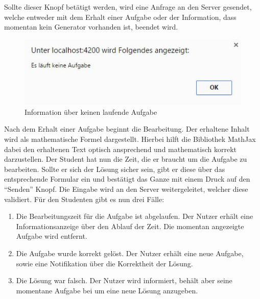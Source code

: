 Sollte dieser Knopf betätigt werden, wird eine Anfrage an den Server gesendet, welche entweder mit dem Erhalt einer Aufgabe oder der Information, dass momentan kein Generator vorhanden ist, beendet wird. \\

\begin{figure}[htp]     %
\centering
\includegraphics[width=1\textwidth]{bilder/NoTaskRunning} 
\caption[Information über keine laufende Aufgabe]{Information über keinen laufende Aufgabe}
\end{figure} 

Nach dem Erhalt einer Aufgabe beginnt die Bearbeitung. Der erhaltene Inhalt wird als mathematische Formel dargestellt. Hierbei hilft die Bibliothek MathJax dabei den erhaltenen Text optisch ansprechend und mathematisch korrekt darzustellen. Der Student hat nun die Zeit, die er braucht um die Aufgabe zu bearbeiten. Sollte er sich der Lösung sicher sein, gibt er diese über das entsprechende Formular ein und bestätigt das Ganze mit einem Druck auf den ``Senden'' Knopf. Die Eingabe wird an den Server weitergeleitet, welcher diese validiert. Für den Studenten gibt es nun drei Fälle: \\
\begin{enumerate}
\itemsep0em
\item Die Bearbeitungszeit für die Aufgabe ist abgelaufen. Der Nutzer erhält eine Informationsanzeige über den Ablauf der Zeit. Die momentan angezeigte Aufgabe wird entfernt.
\item Die Aufgabe wurde korrekt gelöst. Der Nutzer erhält eine neue Aufgabe, sowie eine Notifikation über die Korrektheit der Lösung.
\item Die Lösung war falsch. Der Nutzer wird informiert, behält aber seine momentane Aufgabe bei um eine neue Lösung anzugeben.
\end{enumerate} 

